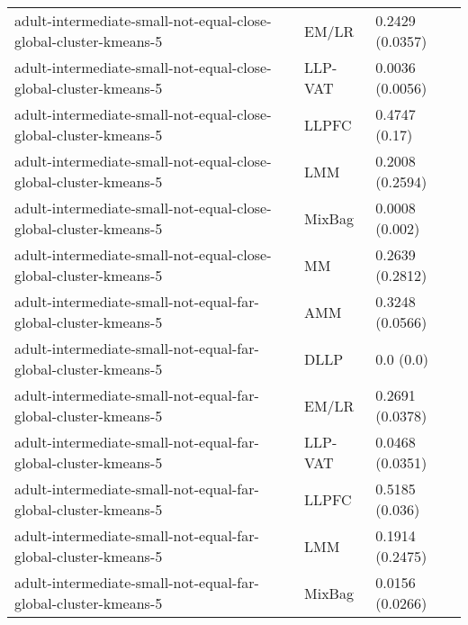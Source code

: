 \begin{longtable}{lll}
                                             adult-intermediate-small-not-equal-close-global-cluster-kmeans-5 &     EM/LR &                       0.2429 (0.0357) \\
                                             adult-intermediate-small-not-equal-close-global-cluster-kmeans-5 &   LLP-VAT &                       0.0036 (0.0056) \\
                                             adult-intermediate-small-not-equal-close-global-cluster-kmeans-5 &     LLPFC &                         0.4747 (0.17) \\
                                             adult-intermediate-small-not-equal-close-global-cluster-kmeans-5 &       LMM &                       0.2008 (0.2594) \\
                                             adult-intermediate-small-not-equal-close-global-cluster-kmeans-5 &    MixBag &                        0.0008 (0.002) \\
                                             adult-intermediate-small-not-equal-close-global-cluster-kmeans-5 &        MM &                       0.2639 (0.2812) \\
                                               adult-intermediate-small-not-equal-far-global-cluster-kmeans-5 &       AMM &                       0.3248 (0.0566) \\
                                               adult-intermediate-small-not-equal-far-global-cluster-kmeans-5 &      DLLP &                             0.0 (0.0) \\
                                               adult-intermediate-small-not-equal-far-global-cluster-kmeans-5 &     EM/LR &                       0.2691 (0.0378) \\
                                               adult-intermediate-small-not-equal-far-global-cluster-kmeans-5 &   LLP-VAT &                       0.0468 (0.0351) \\
                                               adult-intermediate-small-not-equal-far-global-cluster-kmeans-5 &     LLPFC &                        0.5185 (0.036) \\
                                               adult-intermediate-small-not-equal-far-global-cluster-kmeans-5 &       LMM &                       0.1914 (0.2475) \\
                                               adult-intermediate-small-not-equal-far-global-cluster-kmeans-5 &    MixBag &                       0.0156 (0.0266) \\

\end{longtable}
